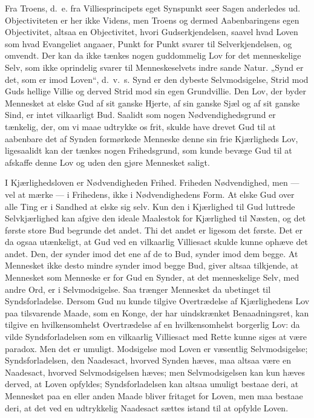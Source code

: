 \documentclass[12pt]{book}
\begin{document}
Fra Troens, d.\ e. fra Villiesprincipets eget Synspunkt seer Sagen
anderledes ud. Objectiviteten er her ikke Videns, men Troens og
dermed Aabenbaringens egen Objectivitet, altsaa en Objectivitet,
hvori Gudserkjendelsen, saavel hvad Loven som hvad Evangeliet
angaaer, Punkt for Punkt svarer til Selverkjendelsen, og omvendt.
Der
kan da ikke tænkes nogen guddommelig Lov for det menneskelige Selv,
som ikke oprindelig svarer til Menneskeselvets indre sande Natur.
„Synd er det, som er imod Loven“, d.\ v.\ s. Synd er den dybeste
Selvmodsigelse, Strid mod Guds hellige Villie og derved Strid mod
sin egen Grundvillie. Den Lov, der byder Mennesket at elske Gud af
sit ganske Hjerte, af sin ganske Sjæl og af sit ganske Sind, er
intet vilkaarligt Bud. Saalidt som nogen Nødvendighedsgrund er
tænkelig, der, om vi maae udtrykke os frit, skulde have drevet Gud
til at aabenbare det af Synden formørkede Menneske denne sin frie
Kjærligheds Lov, ligesaalidt kan der tænkes nogen Frihedsgrund, som
kunde bevæge Gud til at afskaffe denne Lov og uden den gjøre
Mennesket saligt.

I Kjærlighedsloven er Nødvendigheden Frihed. Friheden Nødvendighed,
men --- vel at mærke --- i Frihedens, ikke i Nødvendighedens Form.
At elske Gud over alle Ting er i Sandhed at elske sig selv. Kun den
i Kjærlighed til Gud luttrede Selvkjærlighed kan afgive den ideale
Maalestok for Kjærlighed til Næsten, og det første store Bud
begrunde det andet. Thi det andet er ligesom det første. Det er da
ogsaa utænkeligt, at Gud ved en vilkaarlig Villiesact skulde kunne
ophæve det andet. Den, der synder imod det ene af de to Bud, synder
imod dem begge. At Mennesket ikke desto mindre synder imod begge
Bud, giver altsaa tilkjende, at Mennesket som Menneske er for Gud en
Synder, at det menneskelige Selv, med andre Ord, er i
Selvmodsigelse. Saa trænger Mennesket da ubetinget til
Syndsforladelse. Dersom Gud nu kunde tilgive Overtrædelse af
Kjærlighedens Lov paa tilsvarende Maade, som en Konge, der har
uindskrænket Benaadningsret, kan tilgive en hvilkensomhelst
Overtrædelse af en hvilkensomhelst borgerlig Lov: da vilde
Syndsforladelsen som en vilkaarlig Villiesact med Rette kunne siges
at være paradox. Men det er umuligt. Modsigelse mod
Loven er væsentlig Selvmodsigelse; Syndsforladelsen, den Naadesact,
hvorved Synden hæves, maa altsaa være en Naadesact, hvorved
Selvmodsigelsen hæves; men Selvmodsigelsen kan kun hæves derved, at
Loven opfyldes; Syndsforladelsen kan altsaa umuligt bestaae deri, at
Mennesket paa en eller anden Maade bliver fritaget for Loven, men
maa bestaae deri, at det ved en udtrykkelig Naadesact sættes istand
til at opfylde Loven.
\end{document}
